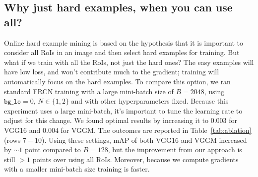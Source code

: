 \documentclass[10pt,twocolumn,letterpaper]{article}
\begin{document}
\subsection{Why just hard examples, when you can use all?}\label{sec:allroi}
Online hard example mining is based on the hypothesis that it is important to consider all RoIs in an image and then select hard examples for training. But what if we train with all the RoIs, not just the hard ones? The easy examples will have low loss, and won't contribute much to the gradient; training will automatically focus on the hard examples. To compare this option, we ran standard FRCN training with a large mini-batch size of $B = 2048$, using $\texttt{bg{\_}lo}=0$, $N\in\{1,2\}$ and with other hyperparameters fixed. Because this experiment uses a large mini-batch, it's important to tune the learning rate to adjust for this change. We found optimal results by increasing it to $0.003$ for VGG16 and $0.004$ for VGGM. The outcomes are reported in Table~\ref{tab:ablation} (rows $7-10$). Using these settings, mAP of both VGG16 and VGGM increased by ${\sim}1$ point compared to $B=128$, but the improvement from our approach is still $>1$ points over using all RoIs. Moreover, because we compute gradients with a smaller mini-batch size training is faster.
\end{document}
